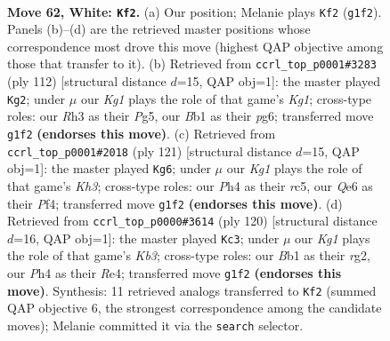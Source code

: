 \documentclass[11pt]{article}
\begin{document}
\clearpage

\begin{figure}[p]\centering
\begin{subfigure}{0.46\textwidth}\centering
\resizebox{\linewidth}{!}{%
\newchessgame
\chessboard[
  setfen={5k2/8/4Q3/8/7P/7R/6P1/1B4K1 w - - 1 62},
  showmover=false,
  pgfstyle=straightmove, color=movearrow, markmove={g1-f2}
]}
\caption{}
\end{subfigure}\hfill
\begin{subfigure}{0.46\textwidth}\centering
\resizebox{\linewidth}{!}{%
\newchessgame
\chessboard[
  setfen={6k1/3q4/6p1/4Q1P1/8/8/5P2/6K1 w - - 17 57},
  showmover=false,
  pgfstyle=straightmove, color=movearrow, markmove={g1-g2}
]}
\caption{}
\end{subfigure}
\\[4pt]
\begin{subfigure}{0.46\textwidth}\centering
\resizebox{\linewidth}{!}{%
\newchessgame
\chessboard[
  setfen={8/1r4p1/7k/2R5/5p2/5P1K/8/8 b - - 1 61},
  showmover=false,
  pgfstyle=straightmove, color=movearrow, markmove={h6-g6}
]}
\caption{}
\end{subfigure}\hfill
\begin{subfigure}{0.46\textwidth}\centering
\resizebox{\linewidth}{!}{%
\newchessgame
\chessboard[
  setfen={2k5/8/8/1P6/1P2R3/1K6/6r1/8 w - - 5 61},
  showmover=false,
  pgfstyle=straightmove, color=movearrow, markmove={b3-c3}
]}
\caption{}
\end{subfigure}
\caption{\textbf{Move 62, White: \texttt{Kf2}.} (a) Our position; Melanie plays \texttt{Kf2} (\texttt{g1f2}). Panels (b)--(d) are the retrieved master positions whose correspondence most drove this move (highest QAP objective among those that transfer to it). (b) Retrieved from \texttt{ccrl\_top\_p0001\#3283} (ply 112) [structural distance $d$=15, QAP obj=1]: the master played \texttt{Kg2}; under $\mu$ our \emph{Kg1} plays the role of that game's \emph{Kg1}; cross-type roles: our \emph{R}h3 as their \emph{P}g5, our \emph{B}b1 as their \emph{p}g6; transferred move \texttt{g1f2} \textbf{(endorses this move)}. (c) Retrieved from \texttt{ccrl\_top\_p0001\#2018} (ply 121) [structural distance $d$=15, QAP obj=1]: the master played \texttt{Kg6}; under $\mu$ our \emph{Kg1} plays the role of that game's \emph{Kh3}; cross-type roles: our \emph{P}h4 as their \emph{r}c5, our \emph{Q}e6 as their \emph{P}f4; transferred move \texttt{g1f2} \textbf{(endorses this move)}. (d) Retrieved from \texttt{ccrl\_top\_p0000\#3614} (ply 120) [structural distance $d$=16, QAP obj=1]: the master played \texttt{Kc3}; under $\mu$ our \emph{Kg1} plays the role of that game's \emph{Kb3}; cross-type roles: our \emph{B}b1 as their \emph{r}g2, our \emph{P}h4 as their \emph{R}e4; transferred move \texttt{g1f2} \textbf{(endorses this move)}. Synthesis: 11 retrieved analogs transferred to \texttt{Kf2} (summed QAP objective 6, the strongest correspondence among the candidate moves); Melanie committed it via the \texttt{search} selector.}
\label{fig:thought-m122}
\end{figure}
\end{document}
